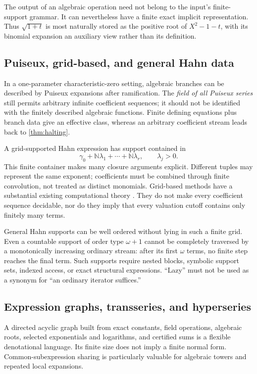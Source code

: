 \documentclass[11pt,letterpaper]{article}
\theoremstyle{definition}
\newcommand{\N}{\mathbb N}
\numberwithin{equation}{section}
\begin{document}
The output of an algebraic operation need not belong to the input's finite-support grammar. It can nevertheless have a finite exact implicit representation. Thus $\sqrt{1+t}$ is most naturally stored as the positive root of $X^2-1-t$, with its binomial expansion an auxiliary view rather than its definition.

\subsection{Puiseux, grid-based, and general Hahn data}
In a one-parameter characteristic-zero setting, algebraic branches can be described by Puiseux expansions after ramification. The \emph{field of all Puiseux series} still permits arbitrary infinite coefficient sequences; it should not be identified with the finitely described algebraic functions. Finite defining equations plus branch data give an effective class, whereas an arbitrary coefficient stream leads back to \cref{thm:halting}.

A grid-supported Hahn expression has support contained in
\begin{equation}\label{eq:grid}
 \gamma_0+\N\lambda_1+\cdots+\N\lambda_r,
 \qquad \lambda_j>0.
\end{equation}
This finite container makes many closure arguments explicit. Different tuples may represent the same exponent; coefficients must be combined through finite convolution, not treated as distinct monomials. Grid-based methods have a substantial existing computational theory \cite{vdH}. They do not make every coefficient sequence decidable, nor do they imply that every valuation cutoff contains only finitely many terms.

General Hahn supports can be well ordered without lying in such a finite grid. Even a countable support of order type $\omega+1$ cannot be completely traversed by a monotonically increasing ordinary stream: after its first $\omega$ terms, no finite step reaches the final term. Such supports require nested blocks, symbolic support sets, indexed access, or exact structural expressions. ``Lazy'' must not be used as a synonym for ``an ordinary iterator suffices.''

\subsection{Expression graphs, transseries, and hyperseries}
A directed acyclic graph built from exact constants, field operations, algebraic roots, selected exponentials and logarithms, and certified sums is a flexible denotational language. Its finite size does not imply a finite normal form. Common-subexpression sharing is particularly valuable for algebraic towers and repeated local expansions.
\end{document}
